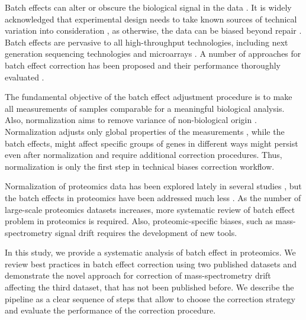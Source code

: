 \documentclass[alpha-refs]{wiley-article}
\begin{document}
Batch effects can alter or obscure the biological signal in the data \cite{Leek:2010aa, Parker:2012aa}. It is widely acknowledged that experimental design needs to take known sources of technical variation into consideration \cite{Oberg2009}, as otherwise, the data can be biased beyond repair  \cite{Hu2005, Gilad2015}. Batch effects are pervasive to all high-throughput technologies, including next generation sequencing technologies and microarrays \cite{Dillies:2013aa, Luo2010}. A number of approaches for batch effect correction has been proposed \cite{Johnson:2007aa, Sims:2008aa, Leek:2007aa, Benito2004} and their performance thoroughly evaluated \cite{Luo2010, Chen:2011ac}. 

The fundamental objective of the batch effect adjustment procedure is to make all measurements of samples comparable for a meaningful biological analysis. Also, normalization aims to remove variance of non-biological origin \cite{Bolstad2003}. Normalization adjusts only global properties of the measurements \cite{Leek:2010aa}, while the batch effects, might affect specific groups of genes in different ways might persist even after normalization and require additional correction procedures. Thus, normalization is only the first step in technical biases correction workflow. 

Normalization of proteomics data has been explored lately in several studies \cite{Karpievitch2012, Chawade:2014aa, Valikangas2018}, but the batch effects in proteomics have been addressed much less \cite{Gregori2012}. As the number of large-scale proteomics datasets increases, more systematic review of batch effect problem in proteomics is required. Also, proteomic-specific biases, such as mass-spectrometry signal drift requires the development of new tools.

In this study, we provide a systematic analysis of batch effect in proteomics. We review best practices in batch effect correction using two published datasets and demonstrate the novel approach for correction of mass-spectrometry drift affecting the third dataset, that has not been published before. We describe the pipeline as a clear sequence of steps that allow to choose the correction strategy and evaluate the performance of the correction procedure.
\end{document}
